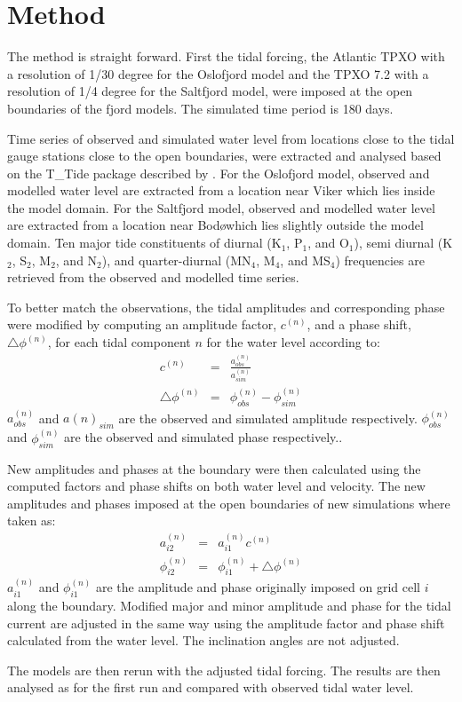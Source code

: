\section{Method}

The method is straight forward. First the tidal forcing, the Atlantic TPXO with a resolution of 1/30 degree for the Oslofjord model and the TPXO 7.2 with a resolution of 1/4 degree for the Saltfjord model, were imposed at the open boundaries of the fjord models. The simulated time period is 180 days. 

Time series of observed and simulated water level from locations close to the tidal gauge stations close to the open boundaries, were extracted and analysed based on the T\_Tide package described by \cite{pawlowicz02}. For the Oslofjord model, observed and modelled water level are extracted from a location near Viker which lies inside the model domain. For the Saltfjord model, observed and modelled water level are extracted from a location near Bod\o which lies slightly outside the model domain. Ten major tide constituents of diurnal (K$_1$, P$_1$, and O$_1$), semi diurnal (K$_2$, S$_2$, M$_2$, and N$_2$), and quarter-diurnal (MN$_4$, M$_4$, and MS$_4$) frequencies are retrieved from the observed and modelled time series. 

To better match the observations, the tidal amplitudes and corresponding phase were modified by computing an amplitude factor, $c^{(n)}$, and a phase shift, $\triangle \phi^{(n)}$, for each tidal component $n$ for the water level according to:
\begin{eqnarray}
c^{(n)} &=& \frac{a^{(n)}_{obs}}{a^{(n)}_{sim}} \\
\triangle \phi^{(n)} &=& \phi^{(n)}_{obs} - \phi^{(n)}_{sim}
\end{eqnarray}
$a^{(n)}_{obs}$ and $a{(n)}_{sim}$ are the observed and simulated amplitude respectively. $\phi^{(n)}_{obs}$ and $\phi^{(n)}_{sim}$ are the observed and simulated phase respectively.. 

New amplitudes and phases at the boundary were then calculated using the computed factors and phase shifts on both water level and velocity. The new amplitudes and phases imposed at the open boundaries of new simulations where taken as:
\begin{eqnarray}
a^{(n)}_{i2} &=& a^{(n)}_{i1} c^{(n)} \\
\phi^{(n)}_{i2} &=& \phi^{(n)}_{i1} + \triangle \phi^{(n)}
\end{eqnarray}
$a^{(n)}_{i1}$ and $\phi^{(n)}_{i1}$ are the amplitude and phase originally imposed on grid cell $i$ along the boundary. Modified major and minor amplitude and phase for the tidal current are adjusted in the same way using the amplitude factor and phase shift calculated from the water level. The inclination angles are not adjusted.

The models are then rerun with the adjusted tidal forcing. The results are then analysed as for the first run and  compared with observed tidal water level. 
